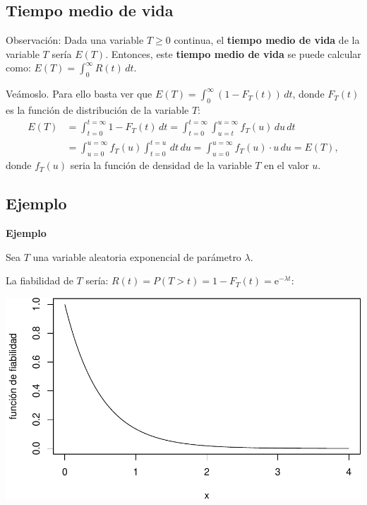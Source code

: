 \documentclass[]{book}
\begin{document}
\hypertarget{tiempo-medio-de-vida}{%
\subsection{Tiempo medio de vida}\label{tiempo-medio-de-vida}}

Observación:
Dada una variable \(T\geq 0\) continua, el \textbf{tiempo medio de vida} de la variable \(T\) sería \(E(T)\). Entonces, este \textbf{tiempo medio de vida} se puede calcular como:
\(E(T)=\int_0^\infty R(t)\, dt.\)

Veámoslo. Para ello basta ver que \(E(T)=\int_0^\infty (1-F_T(t))\, dt\), donde \(F_T(t)\) es la función de distribución de la variable \(T\):
\[
\begin{array}{rl}
E(T) & =\int_{t=0}^{t=\infty} 1-F_T(t)\, dt=\int_{t=0}^{t=\infty}\int_{u=t}^{u=\infty} f_T(u)\,du\,dt \\ & =\int_{u=0}^{u=\infty} f_T(u)\int_{t=0}^{t=u} \, dt\, du =\int_{u=0}^{u=\infty} f_T(u)\cdot u\, du = E(T),
\end{array}
\]
donde \(f_T(u)\) seria la función de densidad de la variable \(T\) en el valor \(u\).

\hypertarget{ejemplo-27}{%
\subsection{Ejemplo}\label{ejemplo-27}}

\textbf{Ejemplo}

Sea \(T\) una variable aleatoria exponencial de parámetro \(\lambda\).

La fiabilidad de \(T\) sería: \(R(t)=P(T>t)=1-F_T(t)=\mathrm{e}^{-\lambda t}\):

\includegraphics{curso-probabilidad-udemy_files/figure-latex/unnamed-chunk-107-1.pdf}
\end{document}
